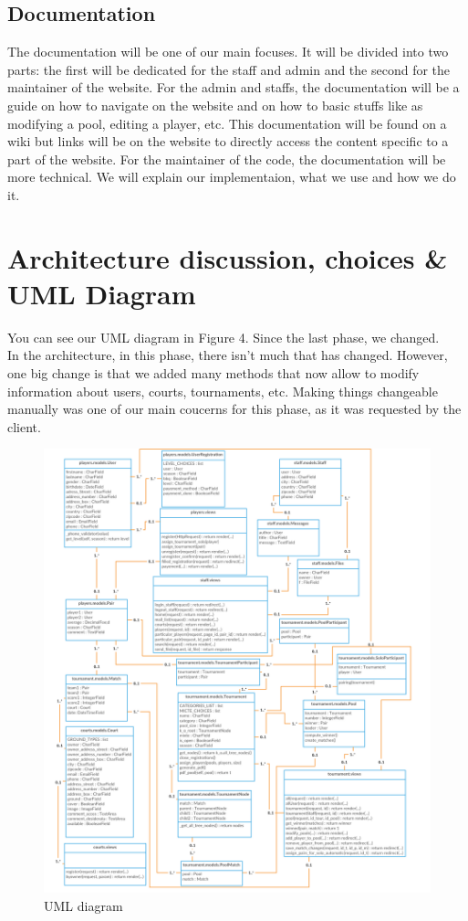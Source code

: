 \documentclass[a4paper, 12pt]{article}
\begin{document}
\subsection{Documentation}
The documentation will be one of our main focuses. It will be divided into two parts: the first will be dedicated for the staff and admin and the second for the maintainer of the website. For the admin and staffs, the documentation will be a guide on how to navigate on the website and on how to basic stuffs like as modifying a pool, editing a player, etc. This documentation will be found on a wiki but links will be on the website to directly access the content specific to a part of the website. For the maintainer of the code, the documentation will be more technical. We will explain our implementaion, what we use and how we do it. 



\newpage
\section{Architecture discussion, choices \& UML Diagram}

You can see our UML diagram in Figure 4. Since the last phase, we changed.\\

In the architecture, in this phase, there isn't much that has changed. However, one big change is that we added many methods that now allow to modify information about users, courts, tournaments, etc. Making things changeable manually was one of our main coucerns for this phase, as it was requested by the client.

\begin{figure}[h]
	\centering
 	\caption{\label{uml} UML diagram}
	\includegraphics[scale=0.2]{Class.png}
\end{figure}
\end{document}

